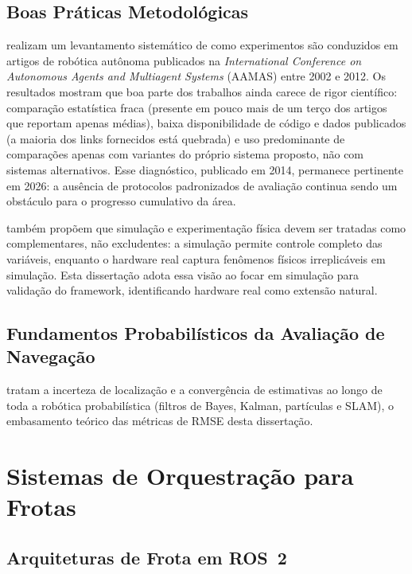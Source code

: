 \subsection{Boas Práticas Metodológicas}

 realizam um levantamento sistemático de como experimentos são
conduzidos em artigos de robótica autônoma publicados na \textit{International Conference
on Autonomous Agents and Multiagent Systems} (AAMAS) entre 2002 e 2012. Os resultados
mostram que boa parte dos trabalhos ainda carece de rigor científico: comparação
estatística fraca (presente em pouco mais de um terço dos artigos que reportam apenas
médias), baixa disponibilidade de código e dados publicados (a maioria dos links
fornecidos está quebrada) e uso predominante de comparações apenas com variantes do
próprio sistema proposto, não com sistemas alternativos. Esse diagnóstico, publicado
em 2014, permanece pertinente em 2026: a ausência de protocolos padronizados de
avaliação continua sendo um obstáculo para o progresso cumulativo da área.

 também propõem que simulação e experimentação física devem ser
tratadas como complementares, não excludentes: a simulação permite controle completo
das variáveis, enquanto o hardware real captura fenômenos físicos irreplicáveis em
simulação. Esta dissertação adota essa visão ao focar em simulação para validação
do framework, identificando hardware real como extensão natural.

\subsection{Fundamentos Probabilísticos da Avaliação de Navegação}

 tratam a incerteza de localização e a convergência de
estimativas ao longo de toda a robótica probabilística (filtros de Bayes, Kalman,
partículas e SLAM), o embasamento teórico das métricas de RMSE desta dissertação.

\section{Sistemas de Orquestração para Frotas}
\label{sec:rel_frota}

\subsection{Arquiteturas de Frota em ROS~2}

